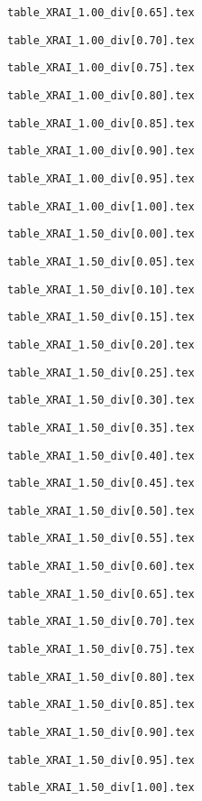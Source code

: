 \documentclass{article}
\begin{document}
\newpage
\verb|table_XRAI_1.00_div[0.65].tex|

\newpage
\verb|table_XRAI_1.00_div[0.70].tex|

\newpage
\verb|table_XRAI_1.00_div[0.75].tex|

\newpage
\verb|table_XRAI_1.00_div[0.80].tex|

\newpage
\verb|table_XRAI_1.00_div[0.85].tex|

\newpage
\verb|table_XRAI_1.00_div[0.90].tex|

\newpage
\verb|table_XRAI_1.00_div[0.95].tex|

\newpage
\verb|table_XRAI_1.00_div[1.00].tex|

\newpage
\verb|table_XRAI_1.50_div[0.00].tex|

\newpage
\verb|table_XRAI_1.50_div[0.05].tex|

\newpage
\verb|table_XRAI_1.50_div[0.10].tex|

\newpage
\verb|table_XRAI_1.50_div[0.15].tex|

\newpage
\verb|table_XRAI_1.50_div[0.20].tex|

\newpage
\verb|table_XRAI_1.50_div[0.25].tex|

\newpage
\verb|table_XRAI_1.50_div[0.30].tex|

\newpage
\verb|table_XRAI_1.50_div[0.35].tex|

\newpage
\verb|table_XRAI_1.50_div[0.40].tex|

\newpage
\verb|table_XRAI_1.50_div[0.45].tex|

\newpage
\verb|table_XRAI_1.50_div[0.50].tex|

\newpage
\verb|table_XRAI_1.50_div[0.55].tex|

\newpage
\verb|table_XRAI_1.50_div[0.60].tex|

\newpage
\verb|table_XRAI_1.50_div[0.65].tex|

\newpage
\verb|table_XRAI_1.50_div[0.70].tex|

\newpage
\verb|table_XRAI_1.50_div[0.75].tex|

\newpage
\verb|table_XRAI_1.50_div[0.80].tex|

\newpage
\verb|table_XRAI_1.50_div[0.85].tex|

\newpage
\verb|table_XRAI_1.50_div[0.90].tex|

\newpage
\verb|table_XRAI_1.50_div[0.95].tex|

\newpage
\verb|table_XRAI_1.50_div[1.00].tex|

\newpage
\end{document}
